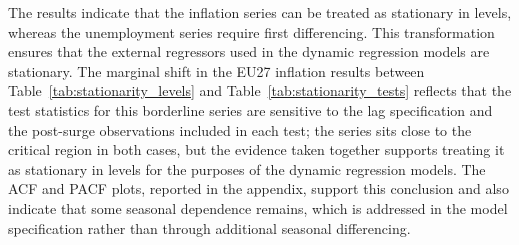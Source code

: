 The results indicate that the inflation series can be treated as stationary in levels, whereas the unemployment series require first differencing. This transformation ensures that the external regressors used in the dynamic regression models are stationary. The marginal shift in the EU27 inflation results between Table~\ref{tab:stationarity_levels} and Table~\ref{tab:stationarity_tests} reflects that the test statistics for this borderline series are sensitive to the lag specification and the post-surge observations included in each test; the series sits close to the critical region in both cases, but the evidence taken together supports treating it as stationary in levels for the purposes of the dynamic regression models. The ACF and PACF plots, reported in the appendix, support this conclusion and also indicate that some seasonal dependence remains, which is addressed in the model specification rather than through additional seasonal differencing.
